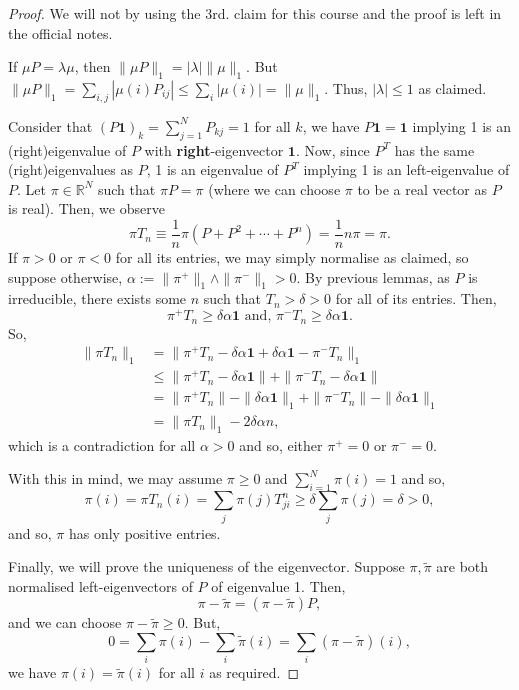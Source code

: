 \documentclass[]{article}
\theoremstyle{definition}
\theoremstyle{definition}
\begin{document}
\begin{proof}
  We will not by using the 3rd. claim for this course and the proof is left in the 
  official notes.

  If \(\mu P = \lambda \mu\), then \(\|\mu P\|_1 = |\lambda| \|\mu\|_1\). But 
  \(\|\mu P\|_1 = \sum_{i, j} |\mu(i)P_{ij}| \le \sum_{i}|\mu(i)| = \|\mu\|_1\).
  Thus, \(|\lambda| \le 1\) as claimed.

  Consider that \((P\mathbf{1})_k = \sum_{j = 1}^N P_{kj} = 1\) for all 
  \(k\), we have \(P\mathbf{1} = \mathbf{1}\) implying 1 is an 
  (right)eigenvalue of \(P\) with \textbf{right}-eigenvector \(\mathbf{1}\). 
  Now, since \(P^T\) has the same (right)eigenvalues as \(P\), 1 is an eigenvalue 
  of \(P^T\) implying 1 is an left-eigenvalue of \(P\). Let \(\pi \in \mathbb{R}^N\)
  such that \(\pi P = \pi\) (where we can choose \(\pi\) to be a real vector as \(P\) 
  is real). Then, we observe 
  \[\pi T_n \equiv \frac{1}{n}\pi(P + P^2 + \cdots + P^n) = \frac{1}{n} n\pi = \pi.\]
  If \(\pi > 0\) or \(\pi < 0\) for all its entries, we may simply normalise as 
  claimed, so suppose otherwise, \(\alpha := \|\pi^+\|_1 \wedge \|\pi^-\|_1 > 0\).
  By previous lemmas, as \(P\) is irreducible, there exists some \(n\) such that 
  \(T_n > \delta > 0\) for all of its entries. Then, 
  \[\pi^+ T_n \ge \delta\alpha \mathbf{1} \text{ and, } 
    \pi^- T_n \ge \delta \alpha \mathbf{1}.\]
  So, 
  \[\begin{split}
    \|\pi T_n\|_1 & = 
    \|\pi^+ T_n - \delta \alpha \mathbf{1} + \delta \alpha \mathbf{1} - \pi^- T_n\|_1 \\
    & \le \|\pi^+ T_n - \delta \alpha \mathbf{1}\| + 
      \|\pi^- T_n - \delta \alpha \mathbf{1}\|\\
    & = \|\pi^+ T_n\| - \|\delta \alpha \mathbf{1}\|_1 + \|\pi^- T_n\| - \|\delta \alpha \mathbf{1}\|_1\\
    & = \|\pi T_n\|_1 - 2 \delta \alpha n,
  \end{split}\]
  which is a contradiction for all \(\alpha > 0\) and so, either \(\pi^+ = 0\) or 
  \(\pi^- = 0\).

  With this in mind, we may assume \(\pi \ge 0\) and \(\sum_{i = 1}^N \pi(i) = 1\) 
  and so, 
  \[\pi(i) = \pi T_n(i) = \sum_{j} \pi(j) T_{ji}^n \ge \delta \sum_{j} \pi(j) = \delta > 0,\]
  and so, \(\pi\) has only positive entries. 

  Finally, we will prove the uniqueness of the eigenvector. Suppose \(\pi, \tilde \pi\) 
  are both normalised left-eigenvectors of \(P\) of eigenvalue 1. Then, 
  \[\pi - \tilde \pi = (\pi - \tilde \pi)P,\]
  and we can choose \(\pi - \tilde \pi \ge 0\). But, 
  \[0 = \sum_i \pi(i) - \sum_i \tilde \pi(i) = \sum_i (\pi - \tilde \pi)(i),\]
  we have \(\pi(i) = \tilde \pi(i)\) for all \(i\) as required.
\end{proof}
\end{document}
